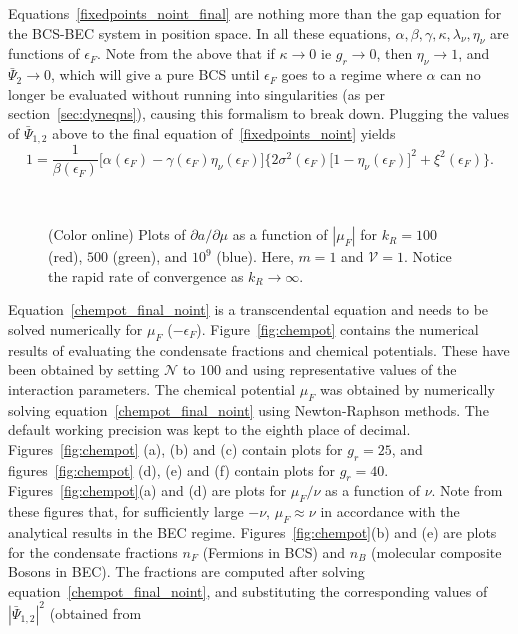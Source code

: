 \documentclass[a4paper,10pt]{article}
\begin{document}
Equations~\ref{fixedpoints_noint_final} are nothing more than the gap equation for the BCS-BEC system in position space. In all these equations, $\alpha,\beta,\gamma,\kappa,\lambda_\nu,\eta_\nu$ are functions of $\epsilon_F$. Note from the above that if $\kappa\rightarrow0$ ie $g_r \rightarrow0$, then $\eta_\nu\rightarrow 1$, and  $ \bar{\Psi}_2\rightarrow0$, which will give  a pure BCS until $\epsilon_F$ goes to a regime where $\alpha$ can no longer be evaluated without running into singularities (as per section~\ref{sec:dyneqns}), causing this formalism to break down. Plugging the values of $\bar{\Psi}_{1,2}$ above to the final equation of~\ref{fixedpoints_noint} yields
\begin{equation}
\label{chempot_final_noint}
1=\frac{1}{\beta(\epsilon_F)}\bigg[\alpha(\epsilon_F) - \gamma(\epsilon_F)\eta_\nu(\epsilon_F) \bigg] \bigg\{2\sigma^2(\epsilon_F)\big[1-\eta_\nu(\epsilon_F)\big]^2 +\xi^2(\epsilon_F)\bigg\}.
\end{equation}
\pagebreak
\begin{figure}[h!bt]
\ 
\caption{(Color online) Plots of $\partial a/\partial\mu$ as a function of $|\mu_F|$ for $k_R=100$ (red), $500$ (green), and $10^9$ (blue). Here, $m=1$ and $\mathcal{V}=1$. Notice the rapid rate of convergence as $k_R\rightarrow\infty$.}
\label{fig:xi}
\end{figure}
Equation~\ref{chempot_final_noint} is a transcendental equation and needs to be solved numerically for $\mu_F$ ($-\epsilon_F$). 
Figure~\ref{fig:chempot} contains the numerical results of evaluating the condensate fractions and chemical potentials. These have been obtained by setting $\mathcal{N}$ to $100$ and using representative values of the interaction parameters. The chemical potential $\mu_F$ was obtained by numerically solving equation~\ref{chempot_final_noint} using Newton-Raphson methods. The default working precision was kept to the eighth place of decimal. Figures~\ref{fig:chempot} (a), (b) and (c) contain plots for $g_r = 25$, and figures~\ref{fig:chempot} (d), (e) and (f) contain plots for $g_r = 40$. Figures~\ref{fig:chempot}(a) and (d) are plots for $\mu_F/\nu$ as a function of $\nu$. Note from these figures that, for sufficiently large $-\nu$, $\mu_F \approx \nu$ in accordance with the analytical results in the BEC regime. Figures~\ref{fig:chempot}(b) and (e) are plots for the condensate fractions $n_F$ (Fermions in BCS) and $n_B$ (molecular composite Bosons in BEC). The fractions are computed after solving equation~\ref{chempot_final_noint}, and substituting the corresponding values of $|\bar{\Psi}_{1,2}|^2$ (obtained from
\end{document}

